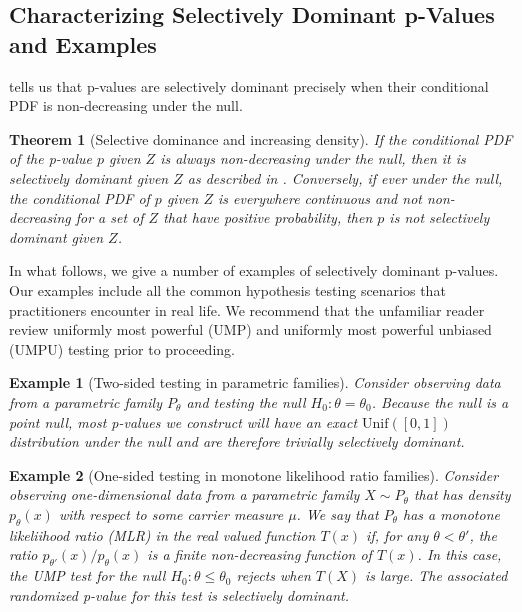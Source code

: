 \documentclass{article}
\newtheorem{example}{Example}
\newtheorem{theorem}{Theorem}
\begin{document}
\subsection{Characterizing Selectively Dominant p-Values and Examples}

 tells us that p-values are selectively dominant precisely when their conditional PDF is non-decreasing under the null. 

\begin{theorem}[Selective dominance and increasing density]
    \label{thm:density}
    If the conditional PDF of the p-value $p$ given $Z$ is always non-decreasing under the null, then it is selectively dominant given $Z$ as described in . Conversely, if ever under the null, the conditional PDF of $p$ given $Z$ is everywhere continuous and not non-decreasing for a set of $Z$ that have positive probability, then $p$ is not selectively dominant given $Z$.  
\end{theorem}

In what follows, we give a number of examples of selectively dominant p-values. Our examples include all the common hypothesis testing scenarios that practitioners encounter in real life. We recommend that the unfamiliar reader review uniformly most powerful (UMP) and uniformly most powerful unbiased (UMPU) testing \cite[Chapter 3 and Chapter 4]{Lehmann} prior to proceeding.

\begin{example}[Two-sided testing in parametric families]
\label{exm:two-sided}
Consider observing data from a parametric family $P_{\theta}$ and testing the null $H_0 : \theta = \theta_0$. Because the null is a point null, most p-values we construct will have an exact $\text{Unif}([0, 1])$ distribution under the null and are therefore trivially selectively dominant. 
\end{example}

\begin{example}[One-sided testing in monotone likelihood ratio families]
\label{exm:mlr}
Consider observing one-dimensional data from a parametric family $X \sim P_{\theta}$ that has density $p_{\theta}(x)$ with respect to some carrier measure $\mu$. We say that $P_{\theta}$ has a monotone likeliihood ratio (MLR) in the real valued function $T(x)$ if, for any $\theta < \theta'$, the ratio $p_{\theta'}(x)/p_{\theta}(x)$ is a finite non-decreasing function of $T(x)$. In this case, the UMP test for the null $H_0: \theta \leq \theta_0$ rejects when $T(X)$ is large. The associated randomized p-value for this test is selectively dominant. 
\end{example}
\end{document}

